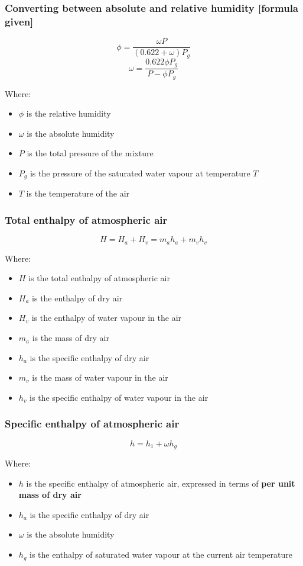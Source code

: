 \documentclass[11pt]{article}
\begin{document}
\subsubsection{Converting between absolute and relative humidity [formula given]}
\label{sec:orgaae3686}
\[\phi = \frac{\omega P}{(0.622 + \omega) P_g}\]
\[\omega = \frac{0.622 \phi P_g}{P - \phi P_g}\]

Where:
\begin{itemize}
\item \(\phi\) is the relative humidity
\item \(\omega\) is the absolute humidity
\item \(P\) is the total pressure of the mixture
\item \(P_g\) is the pressure of the saturated water vapour at temperature \(T\)
\item \(T\) is the temperature of the air
\end{itemize}

\subsubsection{Total enthalpy of atmospheric air}
\label{sec:org7d474c5}
\[H = H_a + H_v = m_a h_a + m_v h_v\]

Where:
\begin{itemize}
\item \(H\) is the total enthalpy of atmospheric air
\item \(H_a\) is the enthalpy of dry air
\item \(H_v\) is the enthalpy of water vapour in the air
\item \(m_a\) is the mass of dry air
\item \(h_a\) is the specific enthalpy of dry air
\item \(m_v\) is the mass of water vapour in the air
\item \(h_v\) is the specific enthalpy of water vapour in the air
\end{itemize}

\subsubsection{Specific enthalpy of atmospheric air}
\label{sec:org06eaaca}
\[h = h_1 + \omega h_g\]

Where:
\begin{itemize}
\item \(h\) is the specific enthalpy of atmospheric air, expressed in terms of \textbf{per unit mass of dry air}
\item \(h_a\) is the specific enthalpy of dry air
\item \(\omega\) is the absolute humidity
\item \(h_g\) is the enthalpy of saturated water vapour at the current air temperature
\end{itemize}
\end{document}
